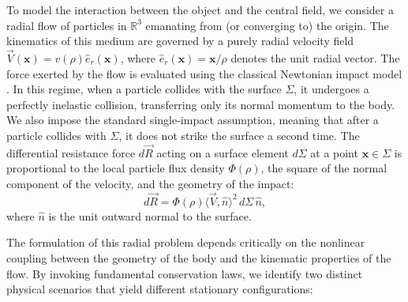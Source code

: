 \documentclass[a4paper,12pt]{amsart}
\theoremstyle{plain}
\theoremstyle{definition}
\begin{document}
 
To model the interaction between the object and the central field, we consider a radial flow of particles in $\mathbb{R}^3$ emanating from (or converging to) the origin. The kinematics of this medium are governed by a purely radial velocity field $\vec{V}(\mathbf{x}) = v(\rho) \hat{e}_r(\mathbf{x})$, where $\hat{e}_r(\mathbf{x})= \mathbf{x}/\rho$ denotes the unit radial vector. The force exerted by the flow is evaluated using the classical Newtonian impact model \cite{buttazzo,go,plakhov_book}. In this regime, when a particle  collides with the surface $\Sigma$, it undergoes a perfectly inelastic collision, transferring only its normal momentum to the body. We also impose the standard single-impact assumption, meaning that after a particle collides with $\Sigma$, it does not strike the surface a second time.  The differential resistance force $d\vec{R}$ acting on a surface element  $d\Sigma$ at  a point $\mathbf{x} \in \Sigma$ is proportional to the local particle flux density $\Phi(\rho)$, the square of the normal component of the velocity, and the geometry of the impact:
\[ d\vec{R} = \Phi(\rho) \langle \vec{V}, \hat{n} \rangle^2 \, d\Sigma\, \hat{n},\]
where $\hat{n}$ is   the unit outward normal to the surface. 


The formulation of this radial problem depends critically on the nonlinear coupling between the geometry of the body and the kinematic properties of the flow. By invoking fundamental conservation laws, we identify two distinct physical scenarios that yield different stationary configurations:  
\end{document}
